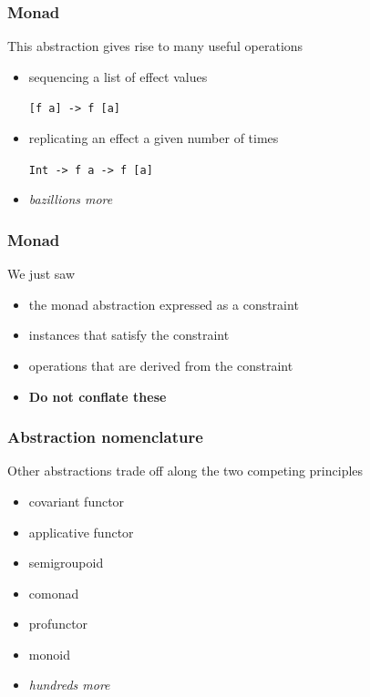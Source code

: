 \begin{frame}
\frametitle{Monad}
\begin{block}{This abstraction gives rise to many useful operations}
\begin{itemize}
  \item sequencing a list of effect values

        \lstinline$[f a] -> f [a]$
  \item replicating an effect a given number of times

        \lstinline$Int -> f a -> f [a]$
  \item \emph{bazillions more}
\end{itemize}
\end{block}
\end{frame}


\begin{frame}
\frametitle{Monad}
\begin{block}{We just saw}
\begin{itemize}
  \item<1> the monad abstraction expressed as a constraint
  \item<2> instances that satisfy the constraint
  \item<3> operations that are derived from the constraint
  \item<4> \textbf{Do not conflate these}
\end{itemize}
\end{block}
\end{frame}


\begin{frame}
\frametitle{Abstraction nomenclature}
\begin{block}{Other abstractions trade off along the two competing principles}
\begin{itemize}
  \item covariant functor
  \item applicative functor
  \item semigroupoid
  \item comonad
  \item profunctor
  \item monoid
  \item \emph{hundreds more}
\end{itemize}
\end{block}
\end{frame}


